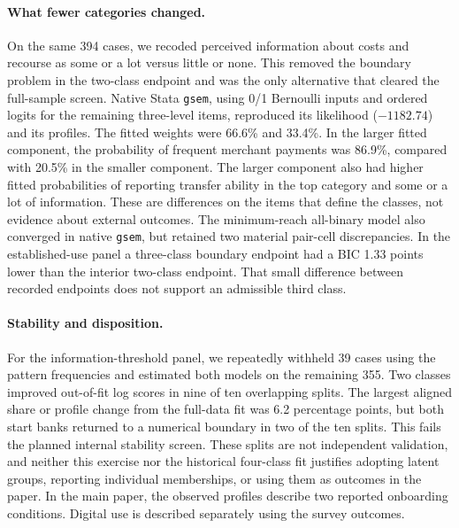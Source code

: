\paragraph{What fewer categories changed.}
On the same 394 cases, we recoded perceived information about costs and recourse as some or a lot versus little or none. This removed the boundary problem in the two-class endpoint and was the only alternative that cleared the full-sample screen. Native Stata \texttt{gsem}, using 0/1 Bernoulli inputs and ordered logits for the remaining three-level items, reproduced its likelihood ($-1182.74$) and its profiles. The fitted weights were 66.6\% and 33.4\%. In the larger fitted component, the probability of frequent merchant payments was 86.9\%, compared with 20.5\% in the smaller component. The larger component also had higher fitted probabilities of reporting transfer ability in the top category and some or a lot of information. These are differences on the items that define the classes, not evidence about external outcomes. The minimum-reach all-binary model also converged in native \texttt{gsem}, but retained two material pair-cell discrepancies. In the established-use panel a three-class boundary endpoint had a BIC 1.33 points lower than the interior two-class endpoint. That small difference between recorded endpoints does not support an admissible third class.

\paragraph{Stability and disposition.}
For the information-threshold panel, we repeatedly withheld 39 cases using the pattern frequencies and estimated both models on the remaining 355. Two classes improved out-of-fit log scores in nine of ten overlapping splits. The largest aligned share or profile change from the full-data fit was 6.2 percentage points, but both start banks returned to a numerical boundary in two of the ten splits. This fails the planned internal stability screen. These splits are not independent validation, and neither this exercise nor the historical four-class fit justifies adopting latent groups, reporting individual memberships, or using them as outcomes in the paper. In the main paper, the observed profiles describe two reported onboarding conditions. Digital use is described separately using the survey outcomes.
